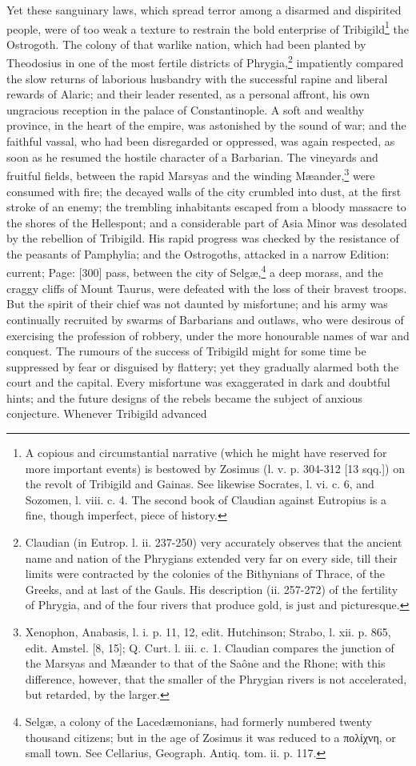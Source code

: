 Yet these sanguinary laws, which spread terror among a disarmed and dispirited people, were of too weak a texture to restrain the bold enterprise of Tribigild\footnote{A copious and circumstantial narrative (which he might have reserved for more important events) is bestowed by Zosimus (l. v. p. 304-312 [13 sqq.]) on the revolt of Tribigild and Gainas. See likewise Socrates, l. vi. c. 6, and Sozomen, l. viii. c. 4. The second book of Claudian against Eutropius is a fine, though imperfect, piece of history.} the Ostrogoth. The colony of that warlike nation, which had been planted by Theodosius in one of the most fertile districts of Phrygia,\footnote{Claudian (in Eutrop. l. ii. 237-250) very accurately observes that the ancient name and nation of the Phrygians extended very far on every side, till their limits were contracted by the colonies of the Bithynians of Thrace, of the Greeks, and at last of the Gauls. His description (ii. 257-272) of the fertility of Phrygia, and of the four rivers that produce gold, is just and picturesque.} impatiently compared the slow returns of laborious husbandry with the successful rapine and liberal rewards of Alaric; and their leader resented, as a personal affront, his own ungracious reception in the palace of Constantinople. A soft and wealthy province, in the heart of the empire, was astonished by the sound of war; and the faithful vassal, who had been disregarded or oppressed, was again respected, as soon as he resumed the hostile character of a Barbarian. The vineyards and fruitful fields, between the rapid Marsyas and the winding Mæander,\footnote{Xenophon, Anabasis, l. i. p. 11, 12, edit. Hutchinson; Strabo, l. xii. p. 865, edit. Amstel. [8, 15]; Q. Curt. l. iii. c. 1. Claudian compares the junction of the Marsyas and Mæander to that of the Saône and the Rhone; with this difference, however, that the smaller of the Phrygian rivers is not accelerated, but retarded, by the larger.} were consumed with fire; the decayed walls of the city crumbled into dust, at the first stroke of an enemy; the trembling inhabitants escaped from a bloody massacre to the shores of the Hellespont; and a considerable part of Asia Minor was desolated by the rebellion of Tribigild. His rapid progress was checked by the resistance of the peasants of Pamphylia; and the Ostrogoths, attacked in a narrow Edition: current; Page: [300] pass, between the city of Selgæ,\footnote{Selgæ, a colony of the Lacedæmonians, had formerly numbered twenty thousand citizens; but in the age of Zosimus it was reduced to a \textgreek{πολίχνη}, or small town. See Cellarius, Geograph. Antiq. tom. ii. p. 117.} a deep morass, and the craggy cliffs of Mount Taurus, were defeated with the loss of their bravest troops. But the spirit of their chief was not daunted by misfortune; and his army was continually recruited by swarms of Barbarians and outlaws, who were desirous of exercising the profession of robbery, under the more honourable names of war and conquest. The rumours of the success of Tribigild might for some time be suppressed by fear or disguised by flattery; yet they gradually alarmed both the court and the capital. Every misfortune was exaggerated in dark and doubtful hints; and the future designs of the rebels became the subject of anxious conjecture. Whenever Tribigild advanced 